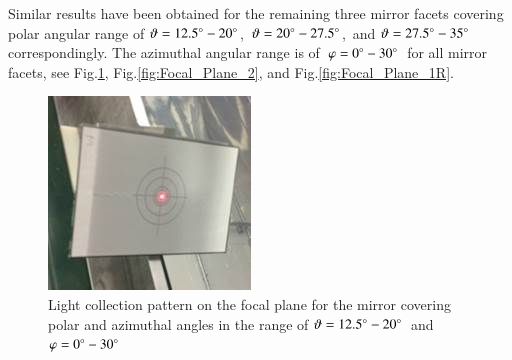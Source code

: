 Similar results have been obtained for the remaining three mirror facets covering polar angular range of $\vartheta = 12.5\degree - 20\degree$,\, $\vartheta = 20\degree - 27.5\degree$,\, and $\vartheta = 27.5\degree - 35\degree$\, correspondingly. The azimuthal angular range is of\, $\varphi = 0\degree - 30\degree$\, for all mirror facets, see Fig.\ref{fig:Focal_Plane_3}, Fig.\ref{fig:Focal_Plane_2}, and Fig.\ref{fig:Focal_Plane_1R}.
\begin{figure}[!h]
    \centering
    \includegraphics[width=1.0\linewidth]{Focal_Plane_3.jpg}
    \caption{Light collection pattern on the focal plane for the mirror covering polar and azimuthal angles in the range of $\vartheta = 12.5\degree - 20\degree$\, and\, $\varphi = 0\degree - 30\degree$}
    \label{fig:Focal_Plane_3}
\end{figure}{}
